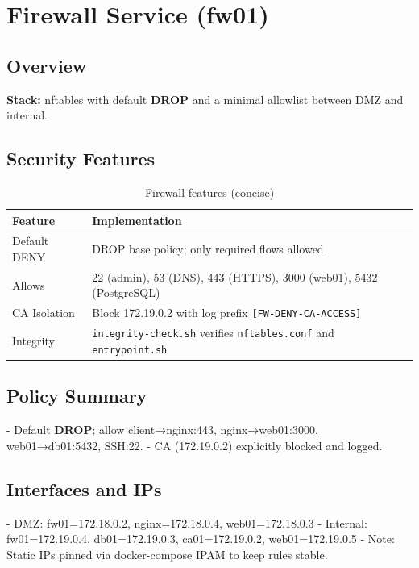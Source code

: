 
\section{Firewall Service (fw01)}

\subsection{Overview}

\textbf{Stack:} nftables with default \textbf{DROP} and a minimal allowlist between DMZ and internal.

\subsection{Security Features}

\begin{table}[H]
\centering
\begin{tabular}{|l|p{10cm}|}
\hline
\textbf{Feature} & \textbf{Implementation} \\
\hline
Default DENY & DROP base policy; only required flows allowed \\
\hline
Allows & 22 (admin), 53 (DNS), 443 (HTTPS), 3000 (web01), 5432 (PostgreSQL) \\
\hline
CA Isolation & Block 172.19.0.2 with log prefix \texttt{[FW-DENY-CA-ACCESS]} \\
\hline
Integrity & \texttt{integrity-check.sh} verifies \texttt{nftables.conf} and \texttt{entrypoint.sh} \\
\hline
\end{tabular}
\caption{Firewall features (concise)}
\end{table}

\subsection{Policy Summary}

- Default \textbf{DROP}; allow client→nginx:443, nginx→web01:3000, web01→db01:5432, SSH:22.
- CA (172.19.0.2) explicitly blocked and logged.

\subsection{Interfaces and IPs}

- DMZ: fw01=172.18.0.2, nginx=172.18.0.4, web01=172.18.0.3
- Internal: fw01=172.19.0.4, db01=172.19.0.3, ca01=172.19.0.2, web01=172.19.0.5
- Note: Static IPs pinned via docker-compose IPAM to keep rules stable.

